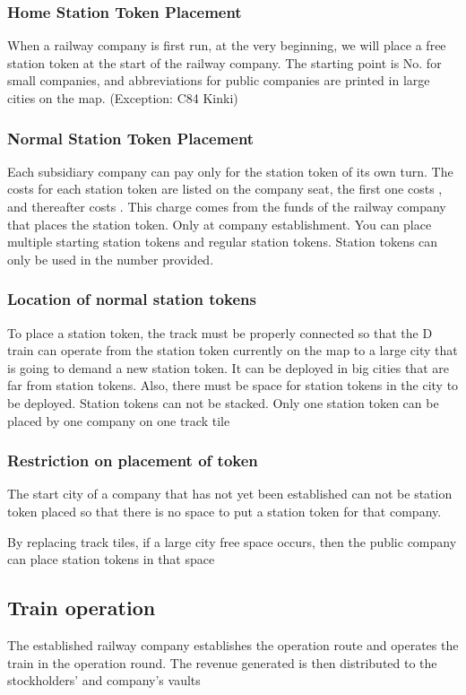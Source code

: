 \documentclass{article}
\begin{document}
\begin{CJK}{UTF8}{min}
\subsubsection{Home Station Token Placement}
When a railway company is first run, at the very beginning, we will
place a free station token at the start of the railway company. The
starting point is No. for small companies, and abbreviations for
public companies are printed in large cities on the map. (Exception:
C84 Kinki)

\subsubsection{Normal Station Token Placement}
Each subsidiary company can pay only for the station token of its own
turn. The costs for each station token are listed on the company seat,
the first one costs , and thereafter costs . This charge
comes from the funds of the railway company that places the station
token. Only at company establishment. You can place multiple starting
station tokens and regular station tokens. Station tokens can only be
used in the number provided.

\subsubsection{Location of normal station tokens}
To place a station token, the track must be properly connected so that
the D train can operate from the station token currently on the map to
a large city that is going to demand a new station token. It can be
deployed in big cities that are far from station tokens. Also, there
must be space for station tokens in the city to be deployed. Station
tokens can not be stacked. Only one station token can be placed by one
company on one track tile

\subsubsection{Restriction on placement of token}
The start city of a company that has not yet been established can not
be station token placed so that there is no space to put a station
token for that company.

By replacing track tiles, if a large city free space occurs, then the
public company can place station tokens in that space

\subsection{Train operation}
The established railway company establishes the operation route and
operates the train in the operation round. The revenue generated is
then distributed to the stockholders' and company's vaults


\end{CJK}
\end{document}
